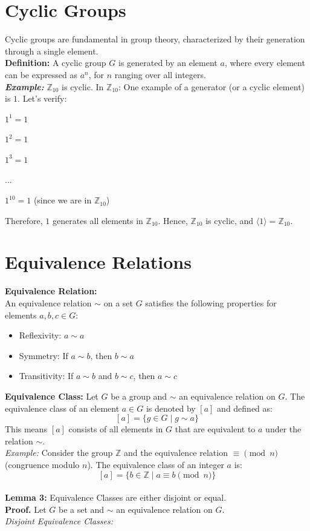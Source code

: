 \section{Cyclic Groups}
Cyclic groups are fundamental in group theory, characterized by their generation through a single element.\\
\textbf{Definition:} A cyclic group \( G \) is generated by an element \( a \), where every element can be expressed as \( a^n \), for \( n \) ranging over all integers.\\
\textit{\textbf{Example:}} \( \mathbb{Z}_{10} \) is cyclic.
In \( \mathbb{Z}_{10} \):
One example of a generator (or a cyclic element) is \( 1 \).
Let's verify:


\( 1^1 = 1 \)

\( 1^2 = 1 \)

\( 1^3 = 1 \)

...

\( 1^{10} = 1 \) (since we are in \( \mathbb{Z}_{10} \))

Therefore, \( 1 \) generates all elements in \( \mathbb{Z}_{10} \). Hence, \( \mathbb{Z}_{10} \) is cyclic, and \( \langle 1 \rangle = \mathbb{Z}_{10} \).


\section{Equivalence Relations}
\textbf{Equivalence Relation:}\\
An equivalence relation \( \sim \) on a set \( G \) satisfies the following properties for elements \( a, b, c \in G \):
\begin{itemize}
    \item Reflexivity: \( a \sim a \)
    \item Symmetry: If \( a \sim b \), then \( b \sim a \)
    \item Transitivity: If \( a \sim b \) and \( b \sim c \), then \( a \sim c \)
\end{itemize}
\textbf{Equivalence Class:}
Let \( G \) be a group and \( \sim \) an equivalence relation on \( G \). The equivalence class of an element \( a \in G \) is denoted by \( [a] \) and defined as:
\[ [a] = \{ g \in G \mid g \sim a \} \]
This means \( [a] \) consists of all elements in \( G \) that are equivalent to \( a \) under the relation \( \sim \).\\
\textit{Example: }Consider the group \( \mathbb{Z} \) and the equivalence relation \( \equiv \pmod{n} \) (congruence modulo \( n \)). The equivalence class of an integer \( a \) is: \[ [a] = \{ b \in \mathbb{Z} \mid a \equiv b \pmod{n} \} \]
\\
\textbf{Lemma 3: }Equivalence Classes are either disjoint or equal.\\
\textbf{Proof.} Let \( G \) be a set and \( \sim \) an equivalence relation on \( G \).\\
\textit{Disjoint Equivalence Classes:}

